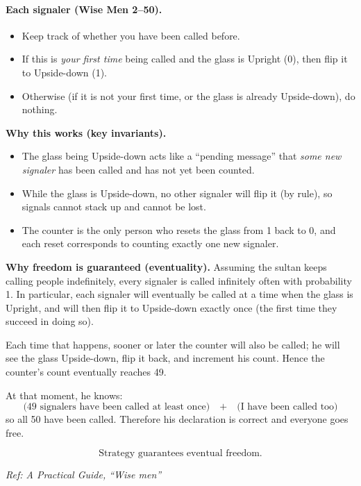 \documentclass[11pt]{article}
\begin{document}
\begin{enumerate}[label=\textbf{\arabic*.}]
\paragraph{Each signaler (Wise Men 2--50).}
\begin{itemize}
\item Keep track of whether you have been called before.
\item If this is \emph{your first time} being called and the glass is Upright (0), then flip it to Upside-down (1).
\item Otherwise (if it is not your first time, or the glass is already Upside-down), do nothing.
\end{itemize}

\medskip
\noindent\textbf{Why this works (key invariants).}
\begin{itemize}
\item The glass being Upside-down acts like a ``pending message'' that \emph{some new signaler} has been called and has not yet been counted.
\item While the glass is Upside-down, no other signaler will flip it (by rule), so signals cannot stack up and cannot be lost.
\item The counter is the only person who resets the glass from 1 back to 0, and each reset corresponds to counting exactly one new signaler.
\end{itemize}

\medskip
\noindent\textbf{Why freedom is guaranteed (eventuality).}
Assuming the sultan keeps calling people indefinitely, every signaler is called infinitely often with probability 1. In particular, each signaler will eventually be called at a time when the glass is Upright, and will then flip it to Upside-down exactly once (the first time they succeed in doing so).

Each time that happens, sooner or later the counter will also be called; he will see the glass Upside-down, flip it back, and increment his count. Hence the counter’s count eventually reaches 49.

At that moment, he knows:
\[
\text{(49 signalers have been called at least once)}\quad + \quad \text{(I have been called too)}
\]
so all 50 have been called. Therefore his declaration is correct and everyone goes free.

\[
\boxed{\text{Strategy guarantees eventual freedom.}}
\]

\hfill{\small\textit{Ref: A Practical Guide, ``Wise men''}}

\end{enumerate}
\end{document}
